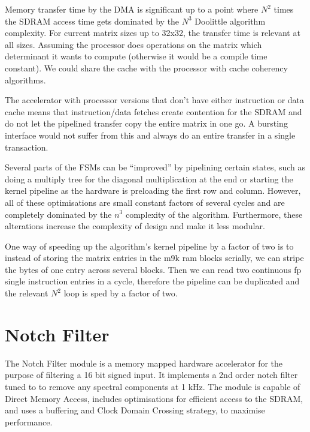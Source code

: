 \documentclass[]{article}
\begin{document}

Memory transfer time by the DMA is significant up to a point where $N^2$ times the SDRAM access time gets dominated by the $N^3$ Doolittle algorithm complexity. For current matrix sizes up to 32x32, the transfer time is relevant at all sizes. Assuming the processor does operations on the matrix which determinant it wants to compute (otherwise it would be a compile time constant). We could share the cache with the processor with cache coherency algorithms.

The accelerator with processor versions that don't have either instruction or data cache means that instruction/data fetches create contention for the SDRAM and do not let the pipelined transfer copy the entire matrix in one go. A bursting interface would not suffer from this and always do an entire transfer in a single transaction.

Several parts of the FSMs can be “improved” by pipelining certain states, such as doing a multiply tree for the diagonal multiplication at the end or starting the kernel pipeline as the hardware is preloading the first row and column. However, all of these optimisations are small constant factors of several cycles and are completely dominated by the $n^3$ complexity of the algorithm. Furthermore, these alterations increase the complexity of design and make it less modular.

One way of speeding up the algorithm’s kernel pipeline by a factor of two is to instead of storing the matrix entries in the m9k ram blocks serially, we can stripe the bytes of one entry across several blocks. Then we can read two continuous fp single instruction entries in a cycle, therefore the pipeline can be duplicated and the relevant $N^2$ loop is sped by a factor of two.



\clearpage

\section{Notch Filter} %
\label{sec:notch_filter}

The Notch Filter module is a memory mapped hardware accelerator for the purpose of filtering a 16 bit signed input. It implements a 2nd order notch filter tuned to to remove any spectral components at 1 kHz.
The module is capable of Direct Memory Access, includes optimisations for efficient access to the SDRAM, and uses a buffering and Clock Domain Crossing strategy, to maximise performance.
\end{document}
